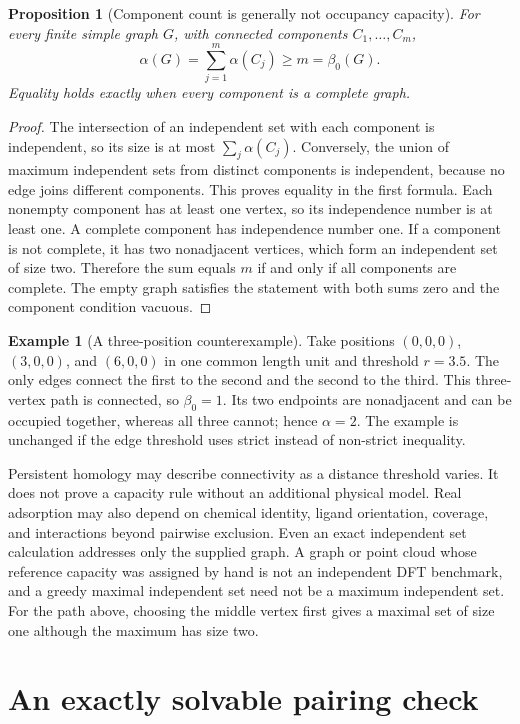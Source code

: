 \documentclass[11pt,a4paper]{article}
\theoremstyle{plain}
\newtheorem{proposition}[theorem]{Proposition}
\theoremstyle{definition}
\newtheorem{example}[theorem]{Example}
\theoremstyle{remark}
\begin{document}
\begin{proposition}[Component count is generally not occupancy capacity]
\label{prop:graph}
For every finite simple graph $G$, with connected components
$C_1,\ldots,C_m$,
\[
 \alpha(G)=\sum_{j=1}^m\alpha(C_j)\ge m=\beta_0(G).
\]
Equality holds exactly when every component is a complete graph.
\end{proposition}
\begin{proof}
The intersection of an independent set with each component is independent,
so its size is at most $\sum_j\alpha(C_j)$. Conversely, the union of
maximum independent sets from distinct components is independent, because
no edge joins different components. This proves equality in the first
formula. Each nonempty component has at least one vertex, so its independence
number is at least one. A complete component has independence number one.
If a component is not complete, it has two nonadjacent vertices, which form
an independent set of size two. Therefore the sum equals $m$ if and only
if all components are complete. The empty graph satisfies the statement
with both sums zero and the component condition vacuous.
\end{proof}

\begin{example}[A three-position counterexample]
Take positions $(0,0,0)$, $(3,0,0)$, and $(6,0,0)$ in one common length
unit and threshold $r=3.5$. The only edges connect the first to the second
and the second to the third. This three-vertex path is connected, so
$\beta_0=1$. Its two endpoints are nonadjacent and can be occupied together,
whereas all three cannot; hence $\alpha=2$. The example is unchanged if the
edge threshold uses strict instead of non-strict inequality.
\end{example}

Persistent homology may describe connectivity as a distance threshold varies.
It does not prove a capacity rule without an additional physical model. Real
adsorption may also depend on chemical identity, ligand orientation, coverage,
and interactions beyond pairwise exclusion. Even an exact independent set
calculation addresses only the supplied graph. A graph or point cloud whose
reference capacity was assigned by hand is not an independent DFT benchmark,
and a greedy maximal independent set need not be a maximum independent set.
For the path above, choosing the middle vertex first gives a maximal set of
size one although the maximum has size two.

\section{An exactly solvable pairing check}
\label{sec:algebra}
\end{document}
